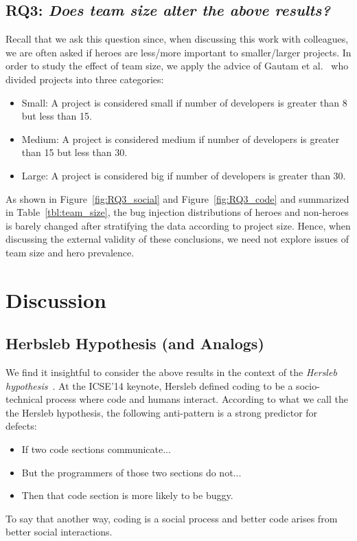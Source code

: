 \documentclass[sigconf,review]{acmart}
\newcommand{\bi}{\begin{itemize}}
\newcommand{\ei}{\end{itemize}}
\begin{document}
\subsection{\textbf{RQ3:} \textit{Does team size alter the above results?}}
\label{sec:RQ3}

Recall that we ask this question since, when discussing this work with colleagues,
we are often asked if heroes are less/more important to smaller/larger projects.
  In order to study the effect of team size,
   we apply the  advice
of Gautam et al.~\cite{gautam2017empirical} who divided projects into three categories:



\begin{itemize}
    \item  Small: A project is considered small if number of developers is greater than 8 but less than 15.
    
    \item  Medium: A project is considered medium if number of developers is greater than 15 but less than 30.
    
    \item  Large: A project is considered big if number of developers is greater than 30.
    
\end{itemize}



 As shown in Figure~\ref{fig:RQ3_social} and Figure~\ref{fig:RQ3_code} and summarized in Table~\ref{tbl:team_size},
  the bug injection distributions of heroes and non-heroes is  barely changed after stratifying the data according to project size. Hence, when discussing the external validity of these conclusions,
we need not explore issues of team size and hero prevalence.





\section{Discussion}
\label{sec:Discussion}

\subsection{Herbsleb Hypothesis (and Analogs)}
We find it insightful to consider the above results in the context of 
the {\em Hersleb hypothesis}~\cite{Herbsleb:2014}. At the ICSE'14 keynote, Hersleb defined coding to be a socio-technical
process where code and humans interact. According to what we call the the Hersleb hypothesis,
the following anti-pattern is a strong predictor for defects:
\bi
\item
 If two code sections communicate...
 \item
But the programmers of those two sections do not...
\item
Then that code section is more likely to be buggy.
\ei
To say that another way,  coding is a social process and better code arises from better social interactions. 
\end{document}
